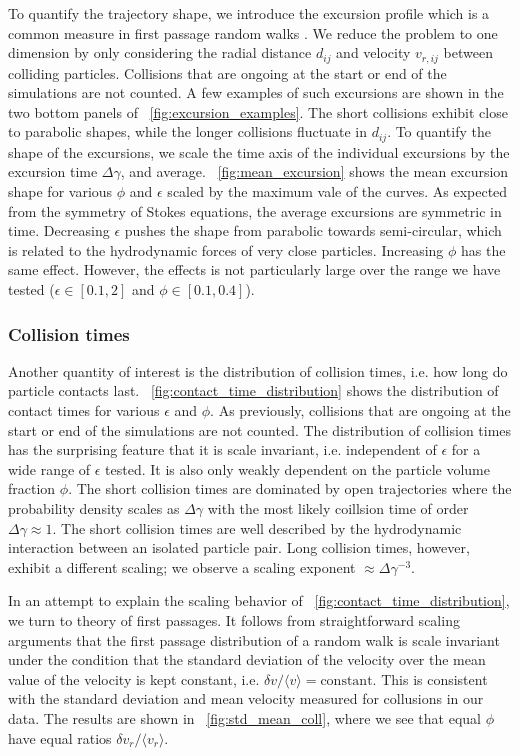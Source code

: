 \documentclass[aps,pre,twocolumn,letterpaper,floatfix,showpacs]{revtex4}
\begin{document}
To quantify the trajectory shape, we introduce the excursion profile which is a common measure in first passage random walks \cite{baldassarri2003average,colaiori2004average}. We reduce the problem to one dimension by only considering the radial distance $d_{ij}$ and velocity $v_{r,{ij}}$ between colliding particles. Collisions that are ongoing at the start or end of the simulations are not counted. A few examples of such excursions are shown in the two bottom panels of \figurename~\ref{fig:excursion_examples}. The short collisions exhibit close to parabolic shapes, while the longer collisions fluctuate in $d_{ij}$. To quantify the shape of the excursions, we scale the time axis of the individual excursions by the excursion time $\Delta \gamma$, and average. \figurename~\ref{fig:mean_excursion} shows the mean excursion shape for various $\phi$ and $\epsilon$ scaled by the maximum vale of the curves. As expected from the symmetry of Stokes equations, the average excursions are symmetric in time. Decreasing $\epsilon$ pushes the shape from parabolic towards semi-circular, which is related to the hydrodynamic forces of very close particles. Increasing $\phi$ has the same effect. However, the effects is not particularly large over the range we have tested ($\epsilon \in [0.1, 2]$ and $\phi \in [0.1, 0.4]$).

\subsubsection{Collision times}
Another quantity of interest is the distribution of collision times, i.e. how long do particle contacts last.  \figurename~\ref{fig:contact_time_distribution} shows the distribution of contact times for various $\epsilon$ and $\phi$. As previously, collisions that are ongoing at the start or end of the simulations are not counted. The distribution of collision times has the surprising feature that it is scale invariant, i.e. independent of $\epsilon$ for a wide range of $\epsilon$ tested. It is also only weakly dependent on the particle volume fraction $\phi$. The short collision times are dominated by open trajectories where the probability density scales as $\Delta \gamma$ with the most likely coillsion time of order $\Delta \gamma \approx 1$. The short collision times are well described by the hydrodynamic interaction between an isolated particle pair. Long collision times, however, exhibit a different scaling; we observe a scaling exponent $\approx \Delta \gamma ^{-3}$. 

In an attempt to explain the scaling behavior of \figurename~\ref{fig:contact_time_distribution}, we turn to theory of first passages.  It follows from straightforward scaling arguments that the first passage distribution of a random walk is scale invariant under the condition that the standard deviation of the velocity over the mean value of the velocity is kept constant, i.e. $\delta v / \langle v \rangle = \text{constant}$. This is consistent with the standard deviation and mean velocity measured for collusions in our data. The results are shown in \figurename~\ref{fig:std_mean_coll}, where we see that equal $\phi$ have equal ratios $\delta v_r / \langle v_r \rangle$.
\end{document}
